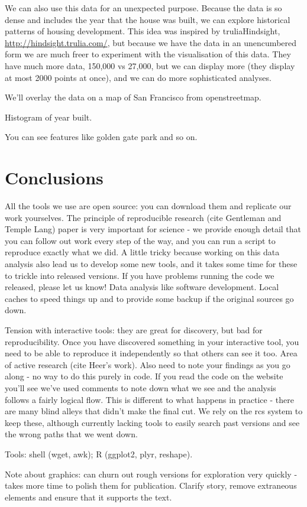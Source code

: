 \documentclass[oneside]{article}
\begin{document}
We can also use this data for an unexpected purpose.  Because the data is so dense and includes the year that the house was built, we can explore historical patterns of housing development.  This idea was inspired by truliaHindsight, \url{http://hindsight.trulia.com/}, but because we have the data in an unencumbered form we are much freer to experiment with the visualisation of this data.  They have much more data, 150,000 vs 27,000, but we can display more (they display at most 2000 points at once), and we can do more sophisticated analyses.

We'll overlay the data on a map of San Francisco from openstreetmap.

Histogram of year built.

You can see features like golden gate park and so on.

\section{Conclusions}

All the tools we use are open source: you can download them and replicate our work yourselves.  The principle of reproducible research (cite Gentleman and Temple Lang) paper is very important for science - we provide enough detail that you can follow out work every step of the way, and you can run a script to reproduce exactly what we did.  A little tricky because working on this data analysis also lead us to develop some new tools, and it takes some time for these to trickle into released versions.  If you have problems running the code we released, please let us know!  Data analysis like software development.  Local caches to speed things up and to provide some backup if the original sources go down.

Tension with interactive tools: they are great for discovery, but bad for reproducibility.  Once you have discovered something in your interactive tool, you need to be able to reproduce it independently so that others can see it too.  Area of active research (cite Heer's work).  Also need to note your findings as you go along - no way to do this purely in code.  If you read the code on the website you'll see we've used comments to note down what we see and the analysis follows a fairly logical flow.  This is different to what happens in practice - there are many blind alleys that didn't make the final cut.  We rely on the rcs system to keep these, although currently lacking tools to easily search past versions and see the wrong paths that we went down.

Tools: shell (wget, awk); R (ggplot2, plyr, reshape).

Note about graphics: can churn out rough versions for exploration very quickly - takes more time to polish them for publication.  Clarify story, remove extraneous elements and ensure that it supports the text.



\end{document}
